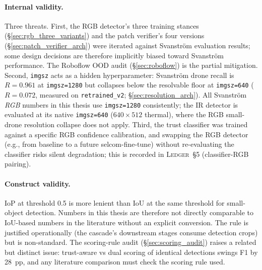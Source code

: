 \documentclass[12pt,a4paper,oneside,openright]{book}
\begin{document}
\paragraph{Internal validity.}
Three threats. First, the RGB detector's three training stances (\S\ref{sec:rgb_three_variants}) and the patch verifier's four versions (\S\ref{sec:patch_verifier_arch}) were iterated against Svanstr\"om evaluation results; some design decisions are therefore implicitly biased toward Svanstr\"om performance. The Roboflow OOD audit (\S\ref{sec:roboflow}) is the partial mitigation. Second, \texttt{imgsz} acts as a hidden hyperparameter: Svanstr\"om drone recall is $R=0.961$ at \texttt{imgsz=1280} but collapses below the resolvable floor at \texttt{imgsz=640} ($R=0.072$, measured on \texttt{retrained\_v2}; \S\ref{sec:resolution_arch}). All Svanstr\"om \emph{RGB} numbers in this thesis use \texttt{imgsz=1280} consistently; the IR detector is evaluated at its native \texttt{imgsz=640} ($640{\times}512$ thermal), where the RGB small-drone resolution collapse does not apply. Third, the trust classifier was trained against a specific RGB confidence calibration, and swapping the RGB detector (e.g., from baseline to a future selcom-fine-tune) without re-evaluating the classifier risks silent degradation; this is recorded in \textsc{Ledger}~\S5 (classifier-RGB pairing).

\paragraph{Construct validity.}
IoP at threshold 0.5 is more lenient than IoU at the same threshold for small-object detection. Numbers in this thesis are therefore not directly comparable to IoU-based numbers in the literature without an explicit conversion. The rule is justified operationally (the cascade's downstream stages consume detection crops) but is non-standard. The scoring-rule audit (\S\ref{sec:scoring_audit}) raises a related but distinct issue: trust-aware vs dual scoring of identical detections swings F1 by 28~pp, and any literature comparison must check the scoring rule used.
\end{document}
